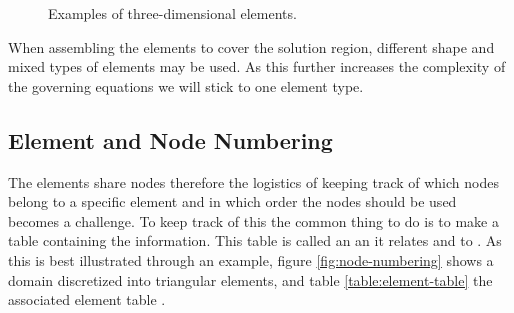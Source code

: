 \begin{figure}
  \centering
  \caption{Examples of three-dimensional elements.}
  \label{fig:3d-elements}
\end{figure}

When assembling the elements to cover the solution region, different
shape and mixed types of elements may be used. As this further
increases the complexity of the governing equations we will stick to
one element type.

\subsection{Element and Node Numbering}
The elements share nodes therefore the logistics of keeping track of which
nodes belong to a specific element and in which order the nodes should
be used becomes a challenge. To keep track of this the common thing to do
is to make a table containing the information. This table is called an
 an it relates  and
 to . As this is
best illustrated through an example, figure \vref{fig:node-numbering}
shows a domain discretized into triangular elements, and table
\vref{table:element-table} the associated element table
.

